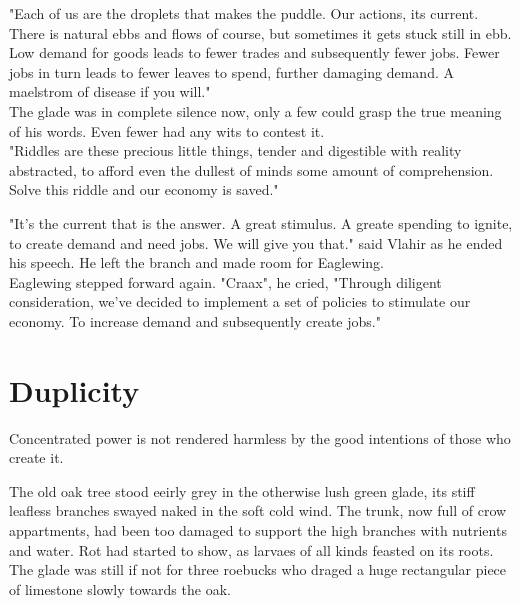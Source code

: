 \documentclass[smalldemyvopaper,11pt,twoside,onecolumn,openright,extrafontsizes]{memoir}
\newlength\drop
\begin{document}
"Each of us are the droplets that makes the puddle. Our actions, its current. There is natural ebbs and flows of course, but sometimes it gets stuck still in ebb. Low demand for goods leads to fewer trades and subsequently fewer jobs. Fewer jobs in turn leads to fewer leaves to spend, further damaging demand. A maelstrom of disease if you will."\\

The glade was in complete silence now, only a few could grasp the true meaning of his words. Even fewer had any wits to contest it. \\

"Riddles are these precious little things, tender and digestible with reality abstracted, to afford even the dullest of minds some amount of comprehension. Solve this riddle and our economy is saved."

"It's the current that is the answer. A great stimulus. A greate spending to ignite, to create demand and need jobs. We will give you that." said Vlahir as he ended his speech. He left the branch and made room for Eaglewing.\\

Eaglewing stepped forward again. "Craax", he cried, "Through diligent consideration, we've decided to implement a set of policies to stimulate our economy. To increase demand and subsequently create jobs."







\chapter{Duplicity}

Concentrated power is not rendered harmless by the good intentions of those who create it.

The old oak tree stood eeirly grey in the otherwise lush green glade, its stiff leafless branches swayed naked in the soft cold wind. The trunk, now full of crow appartments, had been too damaged to support the high branches with nutrients and water. Rot had started to show, as larvaes of all kinds feasted on its roots. The glade was still if not for three roebucks who draged a huge rectangular piece of limestone slowly towards the oak.
\end{document}
